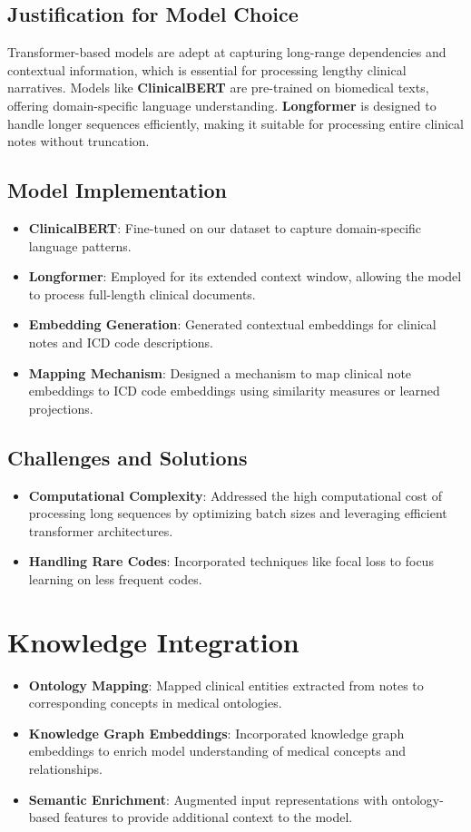 \documentclass[12pt,a4paper]{report}
\begin{document}
\subsection{Justification for Model Choice}
Transformer-based models are adept at capturing long-range dependencies and contextual information, which is essential for processing lengthy clinical narratives. Models like \textbf{ClinicalBERT} are pre-trained on biomedical texts, offering domain-specific language understanding. \textbf{Longformer} is designed to handle longer sequences efficiently, making it suitable for processing entire clinical notes without truncation.

\subsection{Model Implementation}
\begin{itemize}
    \item \textbf{ClinicalBERT}: Fine-tuned on our dataset to capture domain-specific language patterns.
    \item \textbf{Longformer}: Employed for its extended context window, allowing the model to process full-length clinical documents.
    \item \textbf{Embedding Generation}: Generated contextual embeddings for clinical notes and ICD code descriptions.
    \item \textbf{Mapping Mechanism}: Designed a mechanism to map clinical note embeddings to ICD code embeddings using similarity measures or learned projections.
\end{itemize}

\subsection{Challenges and Solutions}
\begin{itemize}
    \item \textbf{Computational Complexity}: Addressed the high computational cost of processing long sequences by optimizing batch sizes and leveraging efficient transformer architectures.
    \item \textbf{Handling Rare Codes}: Incorporated techniques like focal loss to focus learning on less frequent codes.
\end{itemize}

\section{Knowledge Integration}
\begin{itemize}
    \item \textbf{Ontology Mapping}: Mapped clinical entities extracted from notes to corresponding concepts in medical ontologies.
    \item \textbf{Knowledge Graph Embeddings}: Incorporated knowledge graph embeddings to enrich model understanding of medical concepts and relationships.
    \item \textbf{Semantic Enrichment}: Augmented input representations with ontology-based features to provide additional context to the model.
\end{itemize}
\end{document}
